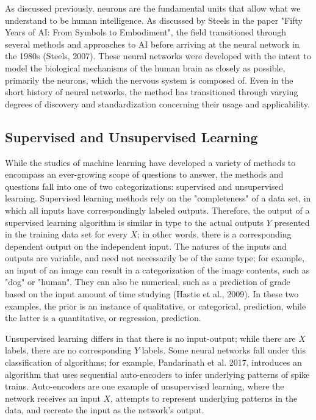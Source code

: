 \documentclass[11pt]{article}
\begin{document}
As discussed previously, neurons are the fundamental units that allow what we understand to be human intelligence. As discussed by Steels in the paper "Fifty Years of AI: From Symbols to Embodiment", the field transitioned through several methods and approaches to AI before arriving at the neural network in the 1980s (Steels, 2007). These neural networks were developed with the intent to model the biological mechanisms of the human brain as closely as possible, primarily the neurons, which the nervous system is composed of. Even in the short history of neural networks, the method has transitioned through varying degrees of discovery and standardization concerning their usage and applicability.\par

\subsection{Supervised and Unsupervised Learning}
While the studies of machine learning have developed a variety of methods to encompass an ever-growing scope of questions to answer, the methods and questions fall into one of two categorizations: supervised and unsupervised learning. Supervised learning methods rely on the "completeness" of a data set, in which all inputs have correspondingly labeled outputs. Therefore, the output of a supervised learning algorithm is similar in type to the actual outputs $Y$ presented in the training data set for every $X$; in other words, there is a corresponding dependent output on the independent input. The natures of the inputs and outputs are variable, and need not necessarily be of the same type; for example, an input of an image can result in a categorization of the image contents, such as "dog" or "human". They can also be numerical, such as a prediction of grade based on the input amount of time studying (Hastie et al., 2009). In these two examples, the prior is an instance of qualitative, or categorical, prediction, while the latter is a quantitative, or regression, prediction.\par

Unsupervised learning differs in that there is no input-output; while there are $X$ labels, there are no corresponding $Y$ labels. Some neural networks fall under this classification of algorithms; for example, Pandarinath et al. 2017, introduces an algorithm that uses sequential auto-encoders to infer underlying patterns of spike trains. Auto-encoders are one example of unsupervised learning, where the network receives an input $X$, attempts to represent underlying patterns in the data, and recreate the input as the network's output. 
\end{document}
